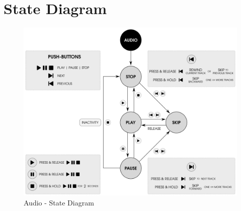 \section{State Diagram} \label{Audio - State Diagram}

\begin{figure}[H]
  \includegraphics{images/audio_state_diagram.png}
\caption{Audio - State Diagram}
\end{figure}
